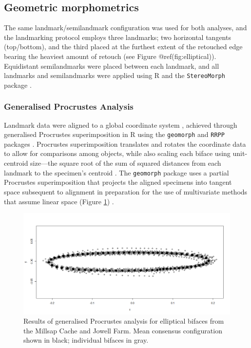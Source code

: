 \documentclass[]{interact}
\theoremstyle{plain}%
\theoremstyle{definition}
\theoremstyle{remark}
\begin{document}
\hypertarget{geometric-morphometrics}{%
\subsection{Geometric morphometrics}\label{geometric-morphometrics}}

The same landmark/semilandmark configuration was used for both analyses,
and the landmarking protocol employs three landmarks; two horizontal
tangents (top/bottom), and the third placed at the furthest extent of
the retouched edge bearing the heaviest amount of retouch (see Figure
@ref(fig:elliptical)). Equidistant semilandmarks were placed between
each landmark, and all landmarks and semilandmarks were applied using R
\citep{R} and the \texttt{StereoMorph} package \citep{RN9091}.

\hypertarget{generalised-procrustes-analysis}{%
\subsubsection{Generalised Procrustes
Analysis}\label{generalised-procrustes-analysis}}

Landmark data were aligned to a global coordinate system
\citep{RN8477,RN7502,RN11622,RN11623,RN11563}, achieved through
generalised Procrustes superimposition \citep{RN11138,RN478,RN1646} in R
using the \texttt{geomorph} and \texttt{RRPP} packages
\citep{RN1655,RN11775,RN11530,RN1774,RN8605}. Procrustes superimposition
translates and rotates the coordinate data to allow for comparisons
among objects, while also scaling each biface using unit-centroid
size---the square root of the sum of squared distances from each
landmark to the specimen's centroid
\citep{RN11139,RN11140,RN11564,RN478}. The \texttt{geomorph} package
uses a partial Procrustes superimposition that projects the aligned
specimens into tangent space subsequent to alignment in preparation for
the use of multivariate methods that assume linear space (Figure
\ref{fig:gpa}) \citep{RN11141,RN11142,RN1646,RN11563}.

\begin{figure}\centering
\includegraphics[width=\linewidth]{figs/gpa.png}
\caption{Results of generalised Procrustes analysis for elliptical bifaces from the Millsap Cache and Jowell Farm. Mean consensus configuration shown in black; individual bifaces in gray.}
\label{fig:gpa}
\end{figure}
\end{document}
